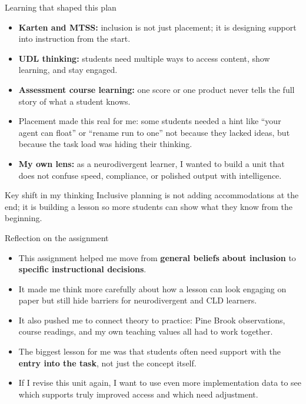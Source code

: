 \documentclass[aspectratio=169,11pt]{beamer}
\begin{document}
\begin{frame}{Learning that shaped this plan}
\begin{itemize}
  \item \textbf{Karten and MTSS:} inclusion is not just placement; it is designing support into instruction from the start.
  \item \textbf{UDL thinking:} students need multiple ways to access content, show learning, and stay engaged.
  \item \textbf{Assessment course learning:} one score or one product never tells the full story of what a student knows.
  \item Placement made this real for me: some students needed a hint like ``your agent can float'' or ``rename run to one'' not because they lacked ideas, but because the task load was hiding their thinking.
  \item \textbf{My own lens:} as a neurodivergent learner, I wanted to build a unit that does not confuse speed, compliance, or polished output with intelligence.
\end{itemize}

\vspace{0.4em}
\begin{block}{Key shift in my thinking}
Inclusive planning is not adding accommodations at the end; it is building a lesson so more students can show what they know from the beginning.
\end{block}
\end{frame}

\begin{frame}{Reflection on the assignment}
\begin{itemize}
  \item This assignment helped me move from \textbf{general beliefs about inclusion} to \textbf{specific instructional decisions}.
  \item It made me think more carefully about how a lesson can look engaging on paper but still hide barriers for neurodivergent and CLD learners.
  \item It also pushed me to connect theory to practice: Pine Brook observations, course readings, and my own teaching values all had to work together.
  \item The biggest lesson for me was that students often need support with the \textbf{entry into the task}, not just the concept itself.
  \item If I revise this unit again, I want to use even more implementation data to see which supports truly improved access and which need adjustment.
\end{itemize}
\end{frame}
\end{document}
